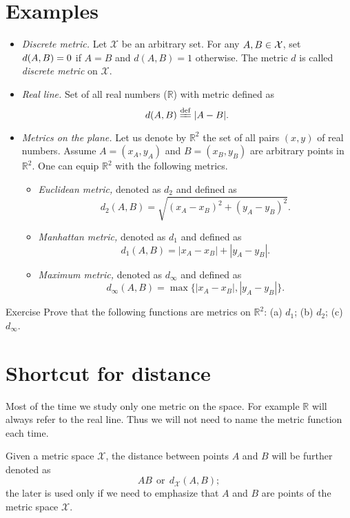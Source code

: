 \section*{Examples}

\begin{itemize}
\item {}\emph{Discrete metric.} Let $\mathcal X$ be an arbitrary set. 
For any $A,B\z\in\mathcal X$, 
set $d(A,B)\z=0$ if $A=B$ and $d(A,B)=1$ otherwise.
The metric $d$ is called \emph{discrete metric} on $\mathcal X$.
\item{}\emph{Real line.} Set of all real numbers ($\mathbb{R}$) with metric defined as 
$$d(A,B)\df|A-B|.$$
\item {}\emph{Metrics on the plane.}
Let us denote by $\mathbb{R}^2$ the set of all pairs $(x,y)$ of real numbers.
Assume $A=(x_A,y_A)$ and $B=(x_B,y_B)$ are arbitrary points in $\mathbb{R}^2$.
One can equip $\mathbb{R}^2$ with the following metrics.
\begin{itemize}
\item{}\emph{Euclidean metric,} denoted as $d_2$ and defined as \label{def:d_2}
$$d_2(A,B)=\sqrt{(x_A-x_B)^2+(y_A-y_B)^2}.$$
\item{}\emph{Manhattan metric,} denoted as $d_1$ and defined as 
$$d_1(A,B)=|x_A-x_B|+|y_A-y_B|.$$
\item{}\emph{Maximum metric,} denoted as $d_\infty$ and defined as 
$$d_\infty(A,B)=\max\{|x_A-x_B|,|y_A-y_B|\}.$$
\end{itemize}
\end{itemize}

\begin{thm}{Exercise}\label{ex:d_1+d_2+d_infty}
Prove that the following functions are metrics on $\mathbb{R}^2$:
(a) $d_1$; (b) $d_2$; (c) $d_\infty$.
\end{thm}


\section*{Shortcut for distance}

Most of the time  
we study only one metric on the space.
For example $\mathbb{R}$ will always refer to the real line.
Thus we will not need to name the metric function each time.

Given a metric space $\mathcal X$,
the distance between points $A$ and $B$ will be further denoted as $$AB\ \ \text{or}\ \ d_{\mathcal X}(A,B);$$
the later is used only if we need to emphasize that $A$ and $B$ are points of the metric space $\mathcal X$.


